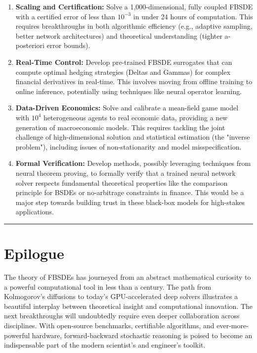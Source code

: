 \begin{enumerate}[label=\textbf{C\arabic*}. ,leftmargin=1.6em]
  \item \textbf{Scaling and Certification:} Solve a 1,000-dimensional, fully coupled FBSDE with a certified error of less than \(10^{-3}\) in under 24 hours of computation. This requires breakthroughs in both algorithmic efficiency (e.g., adaptive sampling, better network architectures) and theoretical understanding (tighter a-posteriori error bounds).
  \item \textbf{Real-Time Control:} Develop pre-trained FBSDE surrogates that can compute optimal hedging strategies (Deltas and Gammas) for complex financial derivatives in real-time. This involves moving from offline training to online inference, potentially using techniques like neural operator learning.
  \item \textbf{Data-Driven Economics:} Solve and calibrate a mean-field game model with \(10^4\) heterogeneous agents to real economic data, providing a new generation of macroeconomic models. This requires tackling the joint challenge of high-dimensional solution and statistical estimation (the "inverse problem"), including issues of non-stationarity and model misspecification.
  \item \textbf{Formal Verification:} Develop methods, possibly leveraging techniques from neural theorem proving, to formally verify that a trained neural network solver respects fundamental theoretical properties like the comparison principle for BSDEs or no-arbitrage constraints in finance. This would be a major step towards building trust in these black-box models for high-stakes applications.
\end{enumerate}

\bigskip\hrule\bigskip

\section*{Epilogue}

The theory of FBSDEs has journeyed from an abstract mathematical curiosity to a powerful computational tool in less than a century. The path from Kolmogorov’s diffusions to today’s GPU-accelerated deep solvers illustrates a beautiful interplay between theoretical insight and computational innovation. The next breakthroughs will undoubtedly require even deeper collaboration across disciplines. With open-source benchmarks, certifiable algorithms, and ever-more-powerful hardware, forward-backward stochastic reasoning is poised to become an indispensable part of the modern scientist's and engineer's toolkit.

